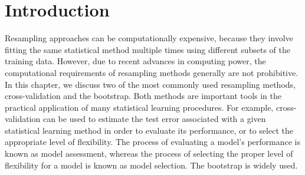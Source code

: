 \section{Introduction}


Resampling approaches can be computationally expensive, because they involve fitting the same statistical method multiple times using different subsets of the training data. However, due to recent advances in computing power, the computational requirements of resampling methods generally are not prohibitive. In this chapter, we discuss two of the most commonly used resampling methods, cross-validation and the bootstrap. Both methods are important tools in the practical application of many statistical learning procedures. For example, cross-validation can be used to estimate the test error associated with a given statistical learning method in order to evaluate its performance, or to select the appropriate level of flexibility. The process of evaluating a model’s performance is known as model assessment, whereas the process of selecting the proper level of flexibility for a model is known as model selection. The bootstrap is widely used.



